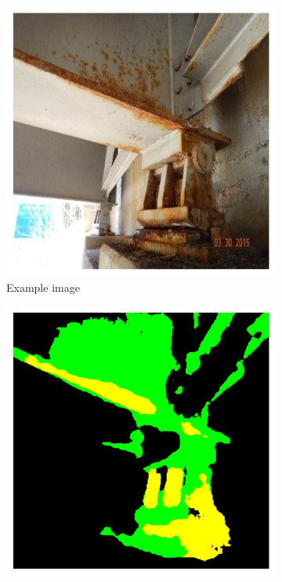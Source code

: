 \documentclass[mathematics,article,submit,pdftex,moreauthors]{Definitions/mdpi}
\begin{document}
\begin{figure}[!ht]
  \centering
    \begin{subfigure}[t]{.4\textwidth}
      \centering
      \includegraphics[width=.95\linewidth]{figures/pruning-results/CCSC/0.jpg}
      \caption{Example image}
      \label{fig:results:pruning:visualization:ccsc-linknet-x}
    \end{subfigure}
    \begin{subfigure}[t]{.4\textwidth}
      \centering
      \includegraphics[width=.95\linewidth]{figures/pruning-results/linknet_CCSC_agp/0/mask_0.jpg}

\end{subfigure}
\end{figure}
\end{document}
